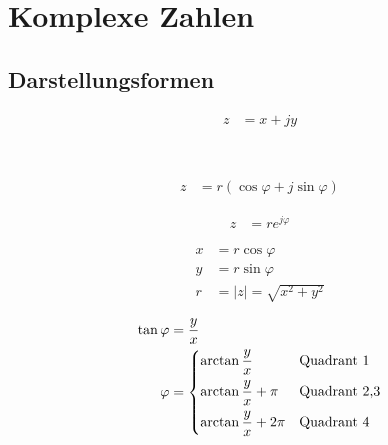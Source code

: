 \section{Komplexe Zahlen}
\subsection{Darstellungsformen}

\begin{boxleft}
\end{boxleft}\begin{boxrightshaded}
 \begin{align} 
z&=x+jy
\end{align}\end{boxrightshaded}

\begin{boxleft}
\\
\end{boxleft}\begin{boxrightshaded}
 \begin{align} 
z&=r\left(\cos{\varphi}+j\sin{\varphi}\right)
\end{align}\end{boxrightshaded}

\begin{boxleft}
\end{boxleft}\begin{boxrightshaded}
 \begin{align} 
z&=re^{j\varphi}
\end{align}\end{boxrightshaded}

\begin{boxleft}
\end{boxleft}\begin{boxrightshaded}
 \begin{align} 
x&=r\cos{\varphi}\\
y&=r\sin{\varphi}\\
r&=\left|z\right|=\sqrt{x^2+y^2}
\end{align}\end{boxrightshaded}

\begin{boxleft}
\end{boxleft}\begin{boxrightshaded}
 \begin{align} 
\tan{\varphi}&=\frac{y}{x}\\
\varphi&=\begin{dcases*}
  \arctan{\frac{y}{x}}& Quadrant 1\\
\arctan{\frac{y}{x}}+\pi& Quadrant 2,3\\
\arctan{\frac{y}{x}}+2\pi& Quadrant 4
\end{dcases*}
\end{align}\end{boxrightshaded}

